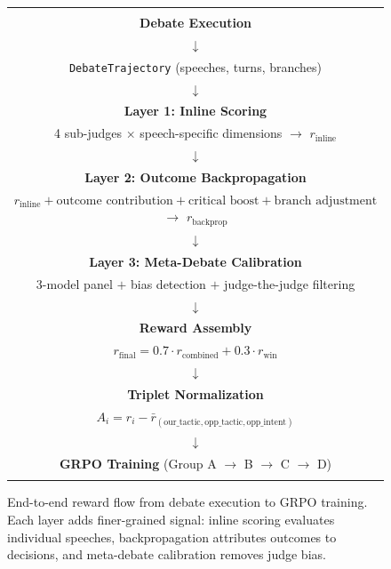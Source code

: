\begin{figure}[h]
\centering
\small
\begin{tabular}{c}
\hline
\\[-0.5em]
\textbf{Debate Execution} \\
$\downarrow$ \\
\texttt{DebateTrajectory} (speeches, turns, branches) \\
$\downarrow$ \\
\textbf{Layer 1: Inline Scoring} \\
4 sub-judges $\times$ speech-specific dimensions $\rightarrow$ $r_{\text{inline}}$ \\
$\downarrow$ \\
\textbf{Layer 2: Outcome Backpropagation} \\
$r_{\text{inline}} + \text{outcome contribution} + \text{critical boost} + \text{branch adjustment}$ $\rightarrow$ $r_{\text{backprop}}$ \\
$\downarrow$ \\
\textbf{Layer 3: Meta-Debate Calibration} \\
3-model panel $+$ bias detection $+$ judge-the-judge filtering \\
$\downarrow$ \\
\textbf{Reward Assembly} \\
$r_{\text{final}} = 0.7 \cdot r_{\text{combined}} + 0.3 \cdot r_{\text{win}}$ \\
$\downarrow$ \\
\textbf{Triplet Normalization} \\
$A_i = r_i - \bar{r}_{(\text{our\_tactic}, \text{opp\_tactic}, \text{opp\_intent})}$ \\
$\downarrow$ \\
\textbf{GRPO Training} (Group A $\rightarrow$ B $\rightarrow$ C $\rightarrow$ D) \\
\\[-0.5em]
\hline
\end{tabular}
\caption{End-to-end reward flow from debate execution to GRPO training.
Each layer adds finer-grained signal: inline scoring evaluates individual
speeches, backpropagation attributes outcomes to decisions, and
meta-debate calibration removes judge bias.}
\label{fig:reward_flow}
\end{figure}
